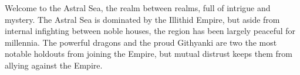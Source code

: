 Welcome to the Astral Sea, the realm between realms, full of intrigue and mystery.
The Astral Sea is dominated by the Illithid Empire, but aside from internal infighting between noble houses, the region has been largely peaceful for millennia.
The powerful dragons and the proud Githyanki are two the most notable holdouts from joining the Empire, but mutual distrust keeps them from allying against the Empire.
